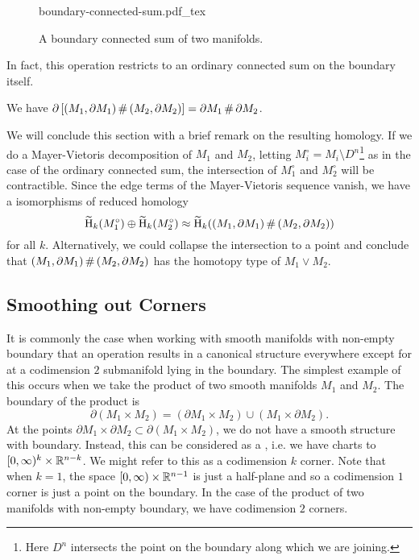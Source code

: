 \begin{figure}[ht]
	\centering
	{boundary-connected-sum.pdf_tex}
	\caption{A boundary connected sum of two manifolds.}\label{fig:boundary-connected-sum}
\end{figure}

In fact, this operation restricts to an ordinary connected sum on the boundary itself.

\begin{proposition} We have $\partial\left[(M_1,\partial M_1)\+ (M_2,\partial M_2)\right] = \partial M_1\+\partial M_2$.
\end{proposition}

We will conclude this section with a brief remark on the resulting homology. If we do a Mayer-Vietoris decomposition of $M_1$ and $M_2$, letting $M_i^\circ=M_i\setminus D^n$\footnote{Here $D^n$ intersects the point on the boundary along which we are joining.} as in the case of the ordinary connected sum, the intersection of $M_1^\circ$ and $M_2^\circ$ will be contractible. Since the edge terms of the Mayer-Vietoris sequence vanish, we have a isomorphisms of reduced homology
\[
		\Hr_k(M_1^\circ)\oplus \Hr_k(M_2^\circ) \cong \Hr_k((M_1,\partial M_1)\+ (M_2,\partial M_2))
\]
for all $k$. Alternatively, we could collapse the intersection to a point and conclude that $(M_1,\partial M_1)\+(M_2,\partial M_2)$ has the homotopy type of $M_1\vee M_2$.

\subsection{Smoothing out Corners}\label{sec:smoothing-corners}

It is commonly the case when working with smooth manifolds with non-empty boundary that an operation results in a canonical structure everywhere except for at a codimension $2$ submanifold lying in the boundary. The simplest example of this occurs when we take the product of two smooth manifolds $M_1$ and $M_2$. The boundary of the product is
\[
		\partial(M_1\times M_2) = (\partial M_1 \times M_2) \cup (M_1\times \partial M_2).
\]
At the points $\partial M_1\times \partial M_2\subset \partial (M_1\times M_2)$, we do not have a smooth structure with boundary. Instead, this can be considered as a , i.e. we have charts to $[0,\infty)^k\times \mathbb{R}^{n-k}$. We might refer to this as a codimension $k$ corner. Note that when $k=1$, the space $[0,\infty)\times \mathbb{R}^{n-1}$ is just a half-plane and so a codimension $1$ corner is just a point on the boundary. In the case of the product of two manifolds with non-empty boundary, we have codimension $2$ corners. 

